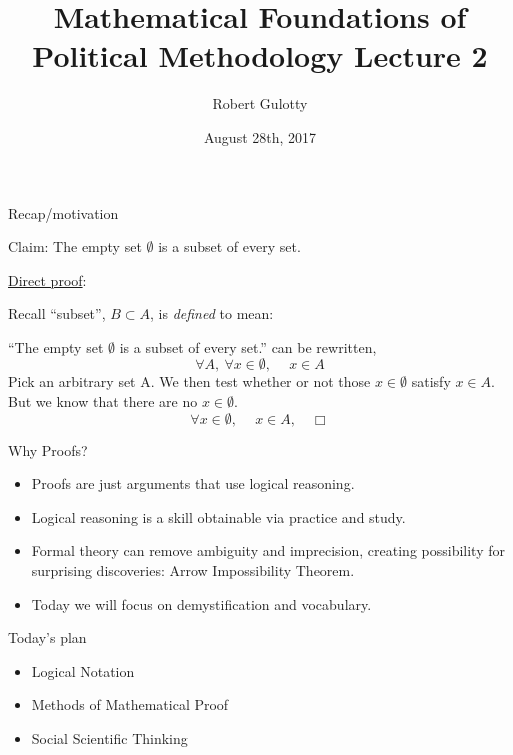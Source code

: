 \documentclass[aspectratio=169, handout]{beamer}
\title[PLSC 43401] %
{Mathematical Foundations of Political Methodology Lecture 2}
\author{Robert Gulotty}
\institute[University of Chicago]{Department of Political Science \\  University of Chicago}
\date{August 28th, 2017}
\numberwithin{equation}{section}
\begin{document}
\begin{frame}
\titlepage
\end{frame}


\begin{frame}{Recap/motivation}

Claim:  The empty set $\emptyset$ is a subset of every set. \pause

 \begin{center}
 \underline{Direct proof}:\\\pause
 \end{center}
Recall ``subset'',  $B\subset A$, is \emph{defined} to mean:\\
  
 \begin{center}
\end{center}
\pause

``The empty set $\emptyset$ is a subset of every set.'' can be rewritten, 
$$\forall A,\ \forall x\in \emptyset,\ \quad  x\in A$$
\pause 
Pick an arbitrary set A.  We then test whether or not those $x\in \emptyset$ satisfy $x\in A$. But we know that there are no $x\in \emptyset$. \pause
$$\forall x\in \emptyset,\ \quad  x\in A, \quad \Box$$  

\end{frame}


\begin{frame}{Why Proofs?}

\begin{itemize}
\item Proofs are just arguments that use logical reasoning.\pause
\item Logical reasoning is a skill obtainable via practice and study.\pause
\item Formal theory can remove ambiguity and imprecision, creating possibility for surprising discoveries: Arrow Impossibility Theorem.\pause
\item Today we will focus on demystification and vocabulary.
\end{itemize}

\end{frame}




\begin{frame}{Today's plan}

\begin{itemize}
\item \textcolor{myblack}{Logical Notation}
\item \textcolor{myblack}{Methods of Mathematical Proof}
\item \textcolor{myblack}{Social Scientific Thinking}
\end{itemize}

\end{frame}
\end{document}
